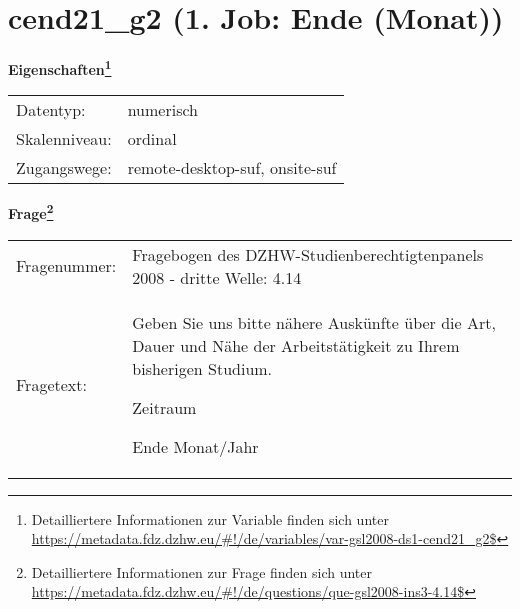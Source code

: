 
    \setcounter{footnote}{0}

    \vspace*{-1.8cm}
	\section{cend21\_g2 (1. Job: Ende (Monat))}
	\label{section:cend21_g2}



    \vspace*{0.5cm}
    \noindent\textbf{Eigenschaften\footnote{Detailliertere Informationen zur Variable finden sich unter
		\url{https://metadata.fdz.dzhw.eu/\#!/de/variables/var-gsl2008-ds1-cend21_g2$}}}\\
	\begin{tabularx}{\hsize}{@{}lX}
	Datentyp: & numerisch \\
	Skalenniveau: & ordinal \\
	Zugangswege: &
	  remote-desktop-suf, 
	  onsite-suf
 \\
    \end{tabularx}



				\vspace*{0.5cm}
                \noindent\textbf{Frage\footnote{Detailliertere Informationen zur Frage finden sich unter
		              \url{https://metadata.fdz.dzhw.eu/\#!/de/questions/que-gsl2008-ins3-4.14$}}}\\
				\begin{tabularx}{\hsize}{@{}lX}
					Fragenummer: &
					  Fragebogen des DZHW-Studienberechtigtenpanels 2008 - dritte Welle:
					  4.14
 \\
					Fragetext: & Geben Sie uns bitte nähere Auskünfte über die Art, Dauer und Nähe der Arbeitstätigkeit zu Ihrem bisherigen Studium.\par  Zeitraum\par  Ende Monat/Jahr \\
				\end{tabularx}





